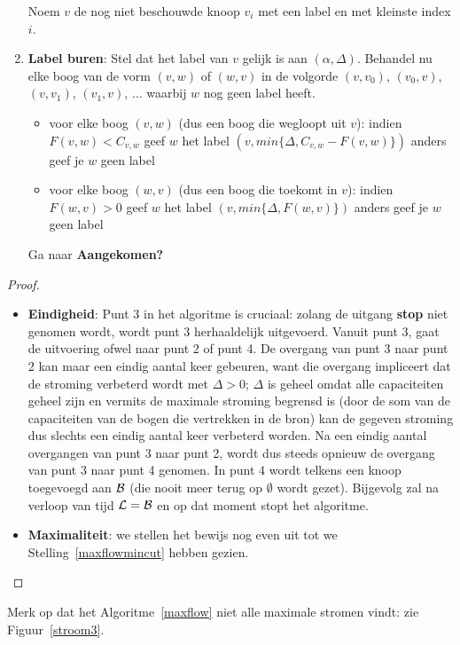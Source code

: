 \begin{algo}
\begin{enumerate}
Noem $v$ de nog niet beschouwde knoop $v_{i}$ met een label en met
kleinste index $i$.
\item
\textbf{Label buren}: Stel dat het label van $v$ gelijk is aan
$(\alpha,\Delta)$. Behandel nu elke boog van de vorm $(v,w)$ of
$(w,v)$ in de volgorde $(v,v_{0})$, $(v_{0},v)$, $(v,v_{1})$, $(v_{1},v)$,
$\ldots $ waarbij $w$ nog geen label heeft.
\begin{itemize}
\item
voor elke boog $(v,w)$ (dus een boog die wegloopt uit $v$):
indien $F(v,w) < C_{v,w}$ geef $w$ het label $(v,min\{\Delta,C_{v,w}-F(v,w)\})$
anders geef je $w$ geen label
\item
voor elke boog $(w,v)$ (dus een boog die toekomt in $v$):
indien $F(w,v) > 0$ geef $w$ het label $(v,min\{\Delta,F(w,v)\})$
anders geef je $w$ geen label
\end{itemize}
Ga naar \textbf{Aangekomen?}
\end{enumerate}
\end{algo}
\begin{proof}
~\\
\begin{itemize}
\item
\textbf{Eindigheid}:
Punt 3 in het algoritme is cruciaal: zolang de uitgang \textbf{stop}
niet genomen wordt, wordt punt 3 herhaaldelijk uitgevoerd. Vanuit punt
3, gaat de uitvoering ofwel naar punt 2 of punt 4. De overgang van
punt 3 naar punt 2 kan maar een eindig aantal keer gebeuren, want die
overgang impliceert dat de stroming verbeterd wordt met $\Delta > 0$;
$\Delta$ is geheel omdat alle capaciteiten geheel zijn en vermits de
maximale stroming begrensd is (door de som van de capaciteiten van de
bogen die vertrekken in de bron) kan de gegeven stroming dus slechts
een eindig aantal keer verbeterd worden. Na een eindig aantal
overgangen van punt 3 naar punt 2, wordt dus steeds opnieuw de
overgang van punt 3 naar punt 4 genomen. In punt 4 wordt telkens een
knoop toegevoegd aan ${\cal B}$ (die nooit meer terug op $\emptyset$
wordt gezet). Bijgevolg zal na verloop van tijd ${\cal L}={\cal B}$ en
op dat moment stopt het algoritme.
\item
\textbf{Maximaliteit}: we stellen het bewijs nog even uit tot we
Stelling~\ref{maxflowmincut} hebben gezien.
\end{itemize}
\end{proof}

Merk op dat het Algoritme~\ref{maxflow} niet alle maximale stromen
vindt: zie Figuur~\ref{stroom3}.


